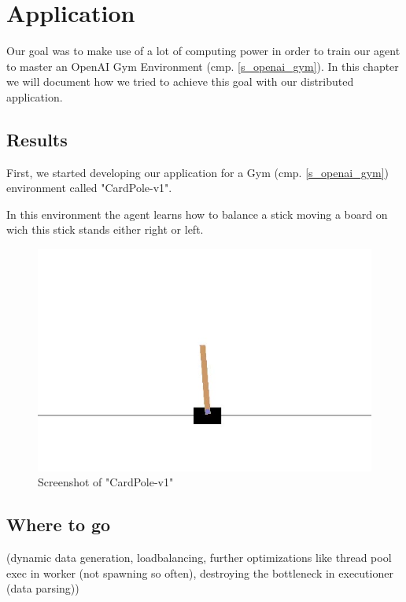 \section{Application}

Our goal was to make use of a lot of computing power in
order to train our agent to master an OpenAI Gym
Environment (cmp. \ref{s_openai_gym}). In this chapter we
will document how we tried to achieve this goal with our
distributed application.




\newpage



\subsection{Results}

First, we started developing our application for a Gym
(cmp. \ref{s_openai_gym}) environment called "CardPole-v1".

In this environment the agent learns how to balance a stick
moving a board on wich this stick stands either right or
left.

\begin{figure}[H]
  \centering
  \includegraphics[width=\textwidth/2]
  {diagrams/cardpole.jpg}
  \caption{Screenshot of "CardPole-v1"}
\end{figure}


\subsection{Where to go}

(dynamic data generation, loadbalancing, further optimizations
like thread pool exec in worker (not spawning so often),
destroying the bottleneck in executioner (data parsing))
